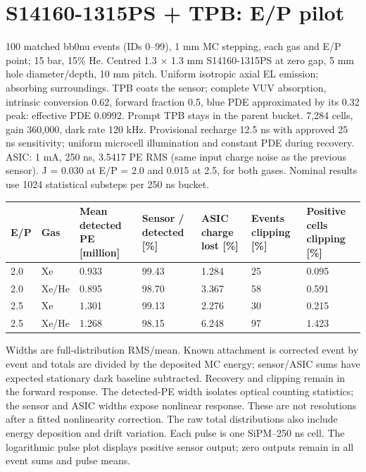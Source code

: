 \documentclass{article}
\begin{document}
\section*{S14160-1315PS + TPB: E/P pilot}
100 matched bb0nu events (IDs 0--99), 1 mm MC stepping, each gas and E/P point; 15 bar, 15\% He. Centred 1.3 $\times$ 1.3 mm S14160-1315PS at zero gap, 5 mm hole diameter/depth, 10 mm pitch. Uniform isotropic axial EL emission; absorbing surroundings. TPB coats the sensor; complete VUV absorption, intrinsic conversion 0.62, forward fraction 0.5, blue PDE approximated by its 0.32 peak: effective PDE 0.0992. Prompt TPB stays in the parent bucket. 7,284 cells, gain 360,000, dark rate 120 kHz. Provisional recharge 12.5 ns with approved 25 ns sensitivity; uniform microcell illumination and constant PDE during recovery. ASIC: 1 mA, 250 ns, 3.5417 PE RMS (same input charge noise as the previous sensor). J = 0.030 at E/P = 2.0 and 0.015 at 2.5, for both gases. Nominal results use 1024 statistical substeps per 250 ns bucket.
\begin{center}\small\begin{tabular}{lllllll}\toprule
E/P & Gas & Mean detected PE [million] & Sensor / detected [\%] & ASIC charge lost [\%] & Events clipping [\%] & Positive cells clipping [\%]\\\midrule
2.0 & Xe & 0.933 & 99.43 & 1.284 & 25 & 0.095\\
2.0 & Xe/He & 0.895 & 98.70 & 3.367 & 58 & 0.591\\
2.5 & Xe & 1.301 & 99.13 & 2.276 & 30 & 0.215\\
2.5 & Xe/He & 1.268 & 98.15 & 6.248 & 97 & 1.423\\
\bottomrule\end{tabular}\end{center}
Widths are full-distribution RMS/mean. Known attachment is corrected event by event and totals are divided by the deposited MC energy; sensor/ASIC sums have expected stationary dark baseline subtracted. Recovery and clipping remain in the forward response. The detected-PE width isolates optical counting statistics; the sensor and ASIC widths expose nonlinear response. These are not resolutions after a fitted nonlinearity correction. The raw total distributions also include energy deposition and drift variation. Each pulse is one SiPM--250 ns cell. The logarithmic pulse plot displays positive sensor output; zero outputs remain in all event sums and pulse means.
\end{document}
